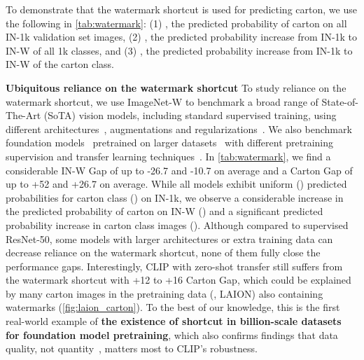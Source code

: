 \documentclass[10pt,twocolumn,letterpaper]{article}
\begin{document}
To demonstrate that the watermark shortcut is used for predicting carton, we use the following in \cref{tab:watermark}: (1) , the predicted probability of carton on all IN-1k validation set images, (2) , the predicted probability increase from IN-1k to IN-W of all 1k classes, and (3) , the predicted probability increase from IN-1k to IN-W of the carton class.


\noindent \textbf{Ubiquitous reliance on the watermark shortcut} \quad To study reliance on the watermark shortcut, we use ImageNet-W to benchmark a broad range of State-of-The-Art (SoTA) vision models, including standard supervised training, using
different architectures~\cite{he2016IEEEConf.Comput.Vis.PatternRecognit.CVPRDeep,radosavovic2020IEEECVFConf.Comput.Vis.PatternRecognit.CVPRDesigning,dosovitskiy2021Int.Conf.Learn.Represent.Image},  augmentations and regularizations~\cite{geirhos2019Int.Conf.Learn.Represent.ImageNettrained,zhang2018Int.Conf.Learn.Represent.mixup,yun2019IEEECVFInt.Conf.Comput.Vis.ICCVCutMix,hendrycks2020Int.Conf.Learn.Represent.AugMixa}. We also benchmark foundation models~\cite{bommasani2022Opportunities} pretrained on larger datasets~\cite{singh2022IEEECVFConf.Comput.Vis.PatternRecognit.CVPRRevisiting,schuhmann2022LAION5B,goyal2022Vision,schuhmann2021Adv.NeuralInf.Process.Syst.WorkshopLAION400M,radford2021Int.Conf.Mach.Learn.Learning} with different pretraining supervision and transfer learning techniques~\cite{chen2021IEEECVFInt.Conf.Comput.Vis.ICCVEmpirical,he2022IEEECVFConf.Comput.Vis.PatternRecognit.CVPRMasked,goyal2022Vision,singh2022IEEECVFConf.Comput.Vis.PatternRecognit.CVPRRevisiting,radford2021Int.Conf.Mach.Learn.Learning,wortsman2022Int.Conf.Mach.Learn.Model}.
In \cref{tab:watermark}, we find a considerable IN-W Gap of up to -26.7 and -10.7 on average and a Carton Gap of up to +52 and +26.7 on average.
While all models exhibit uniform () predicted probabilities for carton class () on IN-1k, we observe a considerable increase in the predicted probability of carton on IN-W () and a significant predicted probability increase in carton class images (). Although compared to supervised ResNet-50, some models with larger architectures or extra training data can decrease reliance on the watermark shortcut, none of them fully close the performance gaps.
Interestingly, CLIP with zero-shot transfer still suffers from the watermark shortcut with +12 to +16 Carton Gap, which could be explained by many carton images in the pretraining data (\eg, LAION) also containing watermarks (\cf \cref{fig:laion_carton}). To the best of our knowledge, this is the first real-world example of \textbf{the existence of shortcut in billion-scale datasets for foundation model pretraining}, which also confirms findings that data quality, not quantity~\cite{fang2022Int.Conf.Mach.Learn.Data,nguyen2022Adv.NeuralInf.Process.Syst.Quality}, matters most to CLIP's robustness.
\end{document}
